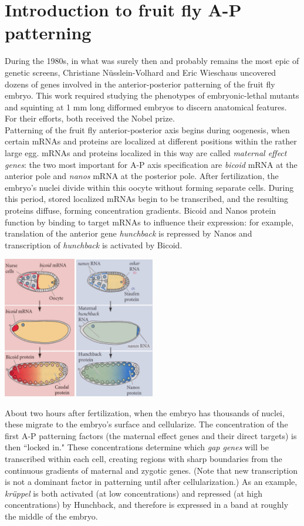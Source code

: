 \documentclass{article}
\begin{document}
\large

\section*{Introduction to fruit fly A-P patterning}

During the 1980s, in what was surely then and probably remains the most epic of genetic screens, Christiane N\"{u}sslein-Volhard and Eric Wieschaus uncovered dozens of genes involved in the anterior-posterior patterning of the fruit fly embryo. This work required studying the phenotypes of embryonic-lethal mutants and squinting at 1 mm long difformed embryos to discern anatomical features. For their efforts, both received the Nobel prize.\\

Patterning of the fruit fly anterior-posterior axis begins during oogenesis, when certain mRNAs and proteins are localized at different positions within the rather large egg. mRNAs and proteins localized in this way are called \textit{maternal effect genes}: the two most important for A-P axis specification are \textit{bicoid} mRNA at the anterior pole and \textit{nanos} mRNA at the posterior pole. After fertilization, the embryo's nuclei divide within this oocyte without forming separate cells. During this period, stored localized mRNAs begin to be transcribed, and the resulting proteins diffuse, forming concentration gradients. Bicoid and Nanos protein function by binding to target mRNAs to influence their expression: for example, translation of the anterior gene \textit{hunchback} is repressed by Nanos and transcription of \textit{hunchback} is activated by Bicoid.

\begin{center}
\includegraphics[width=0.5\textwidth]{gilbertmateffect.jpg}
\end{center}

About two hours after fertilization, when the embryo has thousands of nuclei, these migrate to the embryo's surface and cellularize. The concentration of the first A-P patterning factors (the maternal effect genes and their direct targets) is then ``locked in." These concentrations determine which \textit{gap genes} will be transcribed within each cell, creating regions with sharp boundaries from the continuous gradients of maternal and zygotic genes. (Note that new transcription is not a dominant factor in patterning until after cellularization.) As an example, \textit{kr\"{u}ppel} is both activated (at low concentrations) and repressed (at high concentrations) by Hunchback, and therefore is expressed in a band at roughly the middle of the embryo.
\end{document}
